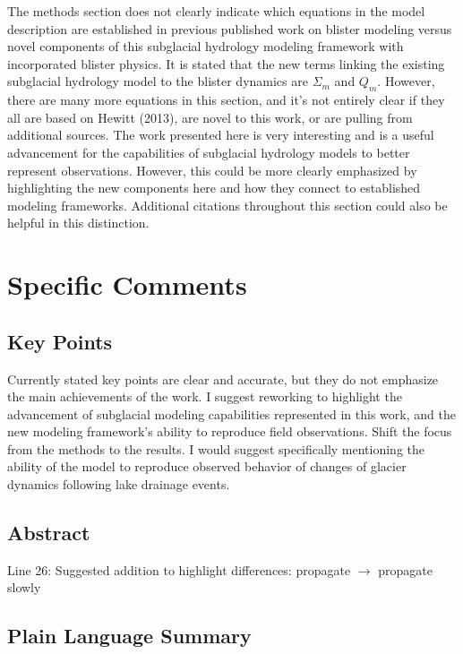 \documentclass[11pt]{article}
\begin{document}
The methods section does not clearly indicate which equations in the model description are
established in previous published work on blister modeling versus novel components of this
subglacial hydrology modeling framework with incorporated blister physics. It is stated that the
new terms linking the existing subglacial hydrology model to the blister dynamics are $\Sigma_m$
and $Q_m$. However, there are many more equations in this section, and it’s not entirely clear if they all
are based on Hewitt (2013), are novel to this work, or are pulling from additional sources. The
work presented here is very interesting and is a useful advancement for the capabilities of
subglacial hydrology models to better represent observations. However, this could be more
clearly emphasized by highlighting the new components here and how they connect to
established modeling frameworks. Additional citations throughout this section could also be
helpful in this distinction.

\section*{Specific Comments}

\subsection*{Key Points}

Currently stated key points are clear and accurate, but they do not emphasize the main
achievements of the work. I suggest reworking to highlight the advancement of subglacial
modeling capabilities represented in this work, and the new modeling framework's ability to
reproduce field observations. Shift the focus from the methods to the results. I would suggest
specifically mentioning the ability of the model to reproduce observed behavior of changes of
glacier dynamics following lake drainage events.

\subsection*{Abstract}

Line 26: Suggested addition to highlight differences: propagate $\rightarrow$ propagate slowly

\subsection*{Plain Language Summary}
\end{document}

